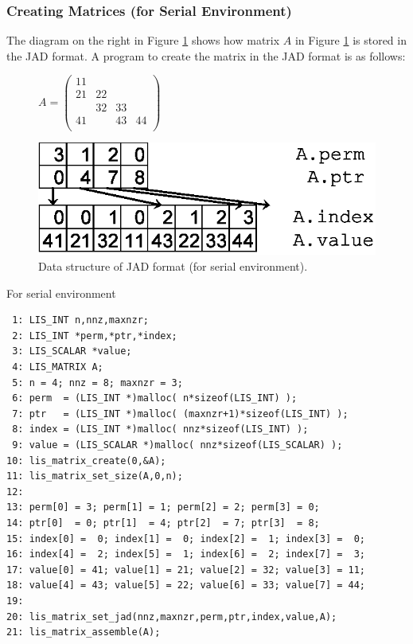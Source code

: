 \documentclass[a4paper]{article}
\begin{document}
\newpage
\subsubsection{Creating Matrices (for Serial Environment)}
The diagram on the right in Figure \ref{fig:storage06} shows how matrix $A$ in Figure \ref{fig:storage06} is stored in the JAD format. A program to create the matrix in the JAD format is as follows: 
\begin{figure}[h]
{\centering 
\begin{minipage}{0.3\textwidth}
\begin{flushright}
$ 
A = \left(
\begin{array}{cccc}
11 &    &    &    \\
21 & 22 &    &    \\
   & 32 & 33 &    \\
41 &    & 43 & 44 \\
\end{array}\right)
$
\end{flushright}
\end{minipage}
\begin{minipage}{0.6\textwidth}
\begin{flushleft}
\includegraphics{storage06.eps} 
\end{flushleft}
\end{minipage}
\caption{Data structure of JAD format (for serial environment).}\label{fig:storage06}}
\end{figure}
\begin{itemsquarebox}[l]{For serial environment}
\small
\begin{verbatim}
 1: LIS_INT n,nnz,maxnzr;
 2: LIS_INT *perm,*ptr,*index;
 3: LIS_SCALAR *value;
 4: LIS_MATRIX A;
 5: n = 4; nnz = 8; maxnzr = 3;
 6: perm  = (LIS_INT *)malloc( n*sizeof(LIS_INT) );
 7: ptr   = (LIS_INT *)malloc( (maxnzr+1)*sizeof(LIS_INT) );
 8: index = (LIS_INT *)malloc( nnz*sizeof(LIS_INT) );
 9: value = (LIS_SCALAR *)malloc( nnz*sizeof(LIS_SCALAR) );
10: lis_matrix_create(0,&A);
11: lis_matrix_set_size(A,0,n);
12:
13: perm[0] = 3; perm[1] = 1; perm[2] = 2; perm[3] = 0;
14: ptr[0]  = 0; ptr[1]  = 4; ptr[2]  = 7; ptr[3]  = 8;
15: index[0] =  0; index[1] =  0; index[2] =  1; index[3] =  0;
16: index[4] =  2; index[5] =  1; index[6] =  2; index[7] =  3;
17: value[0] = 41; value[1] = 21; value[2] = 32; value[3] = 11;
18: value[4] = 43; value[5] = 22; value[6] = 33; value[7] = 44;
19:
20: lis_matrix_set_jad(nnz,maxnzr,perm,ptr,index,value,A);
21: lis_matrix_assemble(A);
\end{verbatim}
\end{itemsquarebox}
\end{document}
